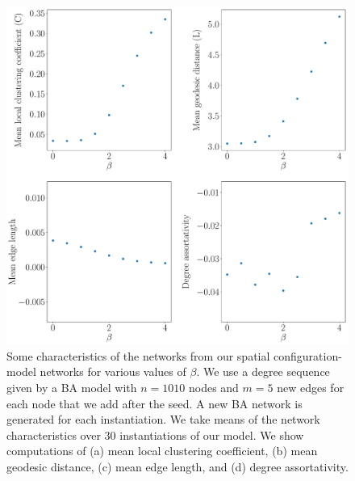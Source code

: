 \documentclass[%
 reprint,
 amsmath,amssymb,
 aps,
]{revtex4-1}
\begin{document}
\begin{figure}
    \centering
    \includegraphics[width=1.0\linewidth]{spatial_configuration_metrics2.pdf}
    \caption{Some characteristics of the networks from our spatial configuration-model networks for various values of $\beta$. We use a degree sequence given by a BA model with $n=1010$ nodes and $m=5$ new edges for each node that we add after the seed. A new BA network is generated for each instantiation. We take means of the network characteristics over $30$ instantiations of our model.
     We show computations of (a) mean local clustering coefficient, (b) mean geodesic distance, (c) mean edge length, and (d) degree assortativity.
    }
    \label{fig:spatial_configuration_metrics}
\end{figure}
\end{document}
